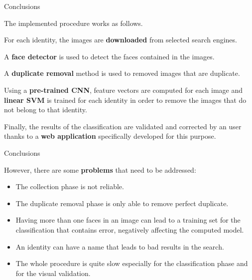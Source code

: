 \begin{tframe}{Conclusions}

The implemented procedure works as follows. 

\vspace{0.1in}

For each identity, the images are \textbf{downloaded} from selected search engines. 

\vspace{0.1in}

A \textbf{face detector} is used to detect the faces contained in the images.

\vspace{0.1in}

A \textbf{duplicate removal} method is used to removed images that are duplicate.

\vspace{0.1in}

Using a \textbf{pre-trained CNN}, feature vectors are computed for each image and \textbf{linear SVM} is trained for each identity in order to remove the images that do not belong to that identity.

\vspace{0.1in}

Finally, the results of the classification are validated and corrected by an user thanks to a \textbf{web application} specifically developed for this purpose.

\end{tframe}


\begin{tframe}{Conclusions}

However, there are some \textbf{problems} that need to be addressed:

\begin{itemize}
\item The collection phase is not reliable.
\item The duplicate removal phase is only able to remove perfect duplicate.
\item Having more than one faces in an image can lead to a training set for the classification that contains error, negatively affecting the computed model.
\item An identity can have a name that leads to bad results in the search.
\item The whole procedure is quite slow especially for the classification phase and for the visual validation.
\end{itemize}

\end{tframe}